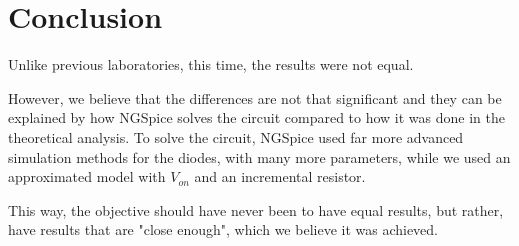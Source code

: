 \section{Conclusion}
\label{sec:conclusion}


\par Unlike previous laboratories, this time, the results were not equal.

However, we believe that the differences are not that significant and they can be explained by how NGSpice solves the circuit compared to how it was done in the theoretical analysis. To solve the circuit, NGSpice used far more advanced simulation methods for the diodes, with many more parameters, while we used an approximated model with $V_{on}$ and an incremental resistor. 

This way, the objective should have never been to have equal results, but rather, have results that are "close enough", which we believe it was achieved.



